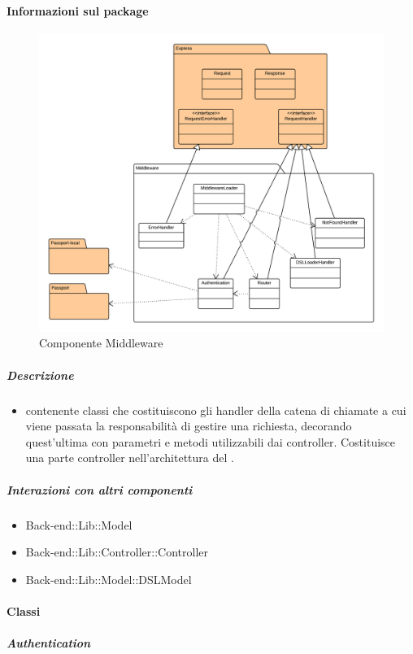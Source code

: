 	\paragraph{Informazioni sul package} 
		\begin{figure}[H] 
			\begin{center} 
				\includegraphics[width=\textwidth]{uml/package/Back-end::Lib::Controller::Middleware.png}  
				\caption{Componente Middleware}
			\end{center}  
		\end{figure} 
	\subparagraph{Descrizione} 
		\begin{itemize}
		\item[]  contenente classi che costituiscono gli handler della catena di chiamate a cui viene
passata la responsabilità di gestire una richiesta, decorando quest’ultima con parametri e
metodi utilizzabili dai controller. Costituisce una parte controller nell’architettura 
del  .

		\end{itemize} 
	\subparagraph{Interazioni con altri componenti} 
		\begin{itemize} 
				\item Back-end::Lib::Model
				\item Back-end::Lib::Controller::Controller
				\item Back-end::Lib::Model::DSLModel  
		\end{itemize} 
		\paragraph{Classi}
			\subparagraph{Authentication}
				
